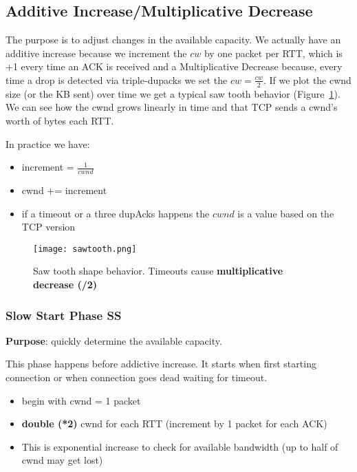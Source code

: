 \subsection{Additive Increase/Multiplicative Decrease}

The purpose is to adjust changes in the available capacity.
We actually have an additive increase because we increment the $cw$ by one
packet per RTT, which is +1 every time an ACK is received and a Multiplicative
Decrease because, every time a drop is detected via triple-dupacks we set the
$cw=\frac{cw}{2}$. If we plot the cwnd size (or the KB sent) over time we get a
typical saw tooth behavior (Figure~\ref{fig:tcp:sawtooth}). We can see how the
cwnd grows linearly in time and that TCP sends a cwnd's worth of bytes each RTT.

In practice we have:
\begin{itemize}
  \item increment = $\frac{1}{cwnd}$
  \item cwnd += increment
  \item if a timeout or a three dupAcks happens the $cwnd$ is a value based on
    the TCP version
\end{itemize}

\begin{figure}[t]
\texttt{[image: sawtooth.png]}
\caption[Saw tooth shape behavior]{Saw tooth shape behavior. Timeouts cause
  \textbf{multiplicative decrease (/2)}}
\label{fig:tcp:sawtooth}
\end{figure}

\subsubsection{Slow Start Phase SS}

\textbf{Purpose}: quickly determine the available capacity.

\noindent This phase happens before addictive increase. It starts when first
starting connection or when connection goes dead waiting for timeout.

\begin{itemize}
\item begin with cwnd = 1 packet
\item \textbf{double (*2)} cwnd for each RTT (increment by 1 packet for each
  ACK)
\item This is exponential increase to check for available bandwidth (up to half
  of cwnd may get lost)
\end{itemize}

